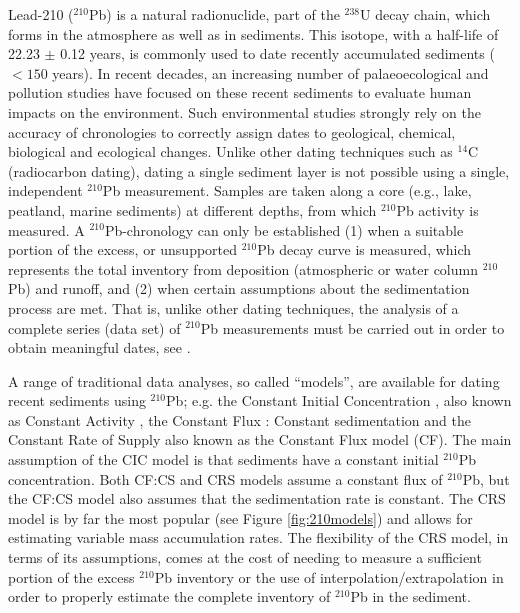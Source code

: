 \documentclass [10pt] {article}
\begin{document}
	Lead-210 ($^{210}$Pb) is a natural radionuclide, part of the $^{238}$U decay chain, which forms in the atmosphere as well as in sediments.
This isotope, with a half-life of 22.23 $\pm$ 0.12 years, is commonly used to date recently accumulated sediments ($<150$ years). 
In recent decades, an increasing number of palaeoecological and pollution studies have focused on these recent sediments \citep[e.g.,][]{Courtney2019} to evaluate human impacts on the environment.
Such environmental studies strongly rely on the accuracy of chronologies to correctly assign dates to geological, chemical, biological and ecological changes.
Unlike other dating techniques such as $^{14}$C (radiocarbon dating), dating a single sediment layer is not possible using a single, independent $^{210}$Pb measurement.
Samples are taken along a core (e.g., lake, peatland, marine sediments) at different depths, from which $^{210}$Pb activity is measured.
A $^{210}$Pb-chronology can only be established (1) when a suitable portion of the excess, or unsupported $^{210}$Pb decay curve is measured, which represents the total inventory from deposition (atmospheric or water column $^{210}$Pb) and runoff, and (2) when certain assumptions about the sedimentation process are met.
That is, unlike other dating techniques, the analysis of a complete series (data set) of $^{210}$Pb measurements must be carried out in order to obtain meaningful dates, see \citet{Aquino2018}.


	A range of traditional data analyses, so called ``models'', are available for dating recent sediments using $^{210}$Pb; e.g. the Constant Initial Concentration \citep[CIC,][]{Goldberg1963}, also known as Constant Activity \citep[CA,][]{Robbins1975}, the Constant Flux : Constant sedimentation \citep[CF:CS,][]{Crozaz1964} and the Constant Rate of Supply  \citep[CRS,][]{Appleby1978,Robbins1978,Sanchez-Cabeza2012} also known as the Constant Flux model (CF). 
The main assumption of the CIC model is that sediments have a constant initial $^{210}$Pb concentration. 
Both CF:CS and CRS models assume a constant flux of $^{210}$Pb, but the CF:CS model also assumes that the sedimentation rate is constant. 
The CRS model is by far the most popular (see Figure \ref{fig:210models}) and allows for estimating variable mass accumulation rates.
The flexibility of the CRS model, in terms of its assumptions, comes at the cost of needing to measure a sufficient portion of the excess $^{210}$Pb inventory or the use of interpolation/extrapolation in order to properly estimate the complete inventory of $^{210}$Pb in the sediment. 
\end{document}
